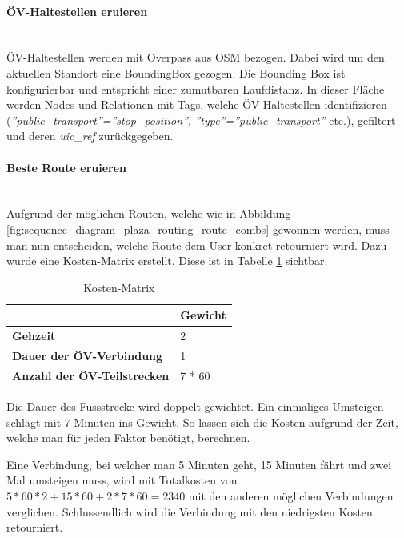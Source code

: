 \paragraph{ÖV-Haltestellen eruieren}\label{impl:Plaza Routing ÖV-Haltestellen eruieren}~\\
ÖV-Haltestellen werden mit Overpass \cite{wiki:overpass} aus \ac{OSM} bezogen. Dabei wird um den aktuellen Standort eine \gls{BoundingBox} gezogen. Die Bounding Box ist konfigurierbar und entspricht einer zumutbaren Laufdistanz. In dieser Fläche werden Nodes und Relationen mit Tags, welche ÖV-Haltestellen identifizieren (\emph{''public\_transport''=''stop\_position''}, \emph{''type''=''public\_transport''} etc.), gefiltert und deren \emph{uic\_ref} zurückgegeben.

\paragraph{Beste Route eruieren}\label{impl:Plaza Routing Beste Route eruieren}~\\
Aufgrund der möglichen Routen, welche wie in Abbildung \ref{fig:sequence_diagram_plaza_routing_route_combs} gewonnen werden, muss man nun entscheiden, welche Route dem User konkret retourniert wird. Dazu wurde eine Kosten-Matrix erstellt. Diese ist in Tabelle \ref{table:cost-matrix} sichtbar.

\begin{table}[ht]
    \centering
    \begin{tabular}{l|l}
        & \textbf{Gewicht} \\ \hline
        \textbf{Gehzeit}                    & 2                \\
        \textbf{Dauer der ÖV-Verbindung}    & 1                \\
        \textbf{Anzahl der ÖV-Teilstrecken} & 7 * 60          
    \end{tabular}
    \caption{Kosten-Matrix}
    \label{table:cost-matrix}
\end{table}

Die Dauer des Fussstrecke wird doppelt gewichtet. Ein einmaliges Umsteigen schlägt mit 7 Minuten ins Gewicht. So lassen sich die Kosten aufgrund der Zeit, welche man für jeden Faktor benötigt, berechnen.

Eine Verbindung, bei welcher man 5 Minuten geht, 15 Minuten fährt und zwei Mal umsteigen muss, wird mit Totalkosten von $5 * 60 * 2 + 15 * 60 + 2 * 7 * 60 = 2340$ mit den anderen möglichen Verbindungen verglichen. Schlussendlich wird die Verbindung mit den niedrigsten Kosten retourniert.

